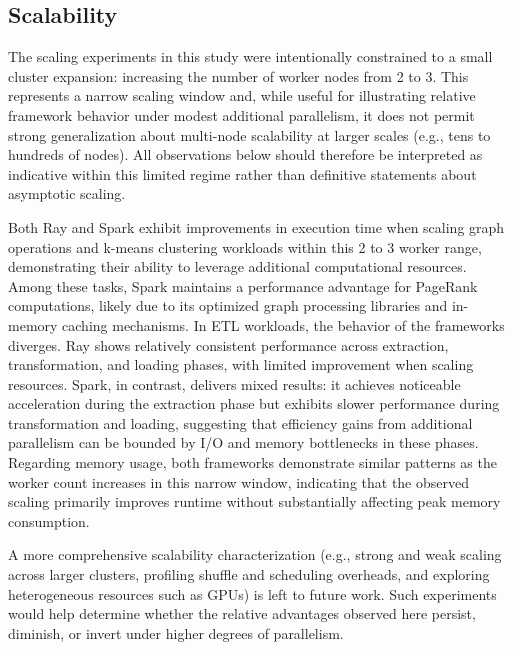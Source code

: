 \documentclass[conference]{IEEEtran}
\begin{document}
\subsection{Scalability}

The scaling experiments in this study were intentionally constrained to a small cluster expansion: 
increasing the number of worker nodes from 2 to 3. 
This represents a narrow scaling window and, while useful for illustrating relative framework behavior under modest additional parallelism, 
it does not permit strong generalization about multi-node scalability at larger scales (e.g., tens to hundreds of nodes). 
All observations below should therefore be interpreted as indicative within this limited regime rather than definitive statements about asymptotic scaling.

Both Ray and Spark exhibit improvements in execution time
when scaling graph operations and k-means clustering workloads
within this 2 to 3 worker range, demonstrating their ability to leverage
additional computational resources. Among these tasks, Spark maintains a
performance advantage for PageRank computations, likely due to
its optimized graph processing libraries and in-memory caching
mechanisms. In ETL workloads, the behavior of the frameworks
diverges. Ray shows relatively consistent performance across
extraction, transformation, and loading phases, with limited
improvement when scaling resources. Spark, in contrast, delivers
mixed results: it achieves noticeable acceleration during the
extraction phase but exhibits slower performance during
transformation and loading, suggesting that efficiency gains
from additional parallelism can be bounded by I/O and memory bottlenecks
in these phases. Regarding memory usage, both frameworks demonstrate
similar patterns as the worker count increases in this narrow window, indicating
that the observed scaling primarily improves runtime without
substantially affecting peak memory consumption.

A more comprehensive scalability characterization 
(e.g., strong and weak scaling across larger clusters, profiling shuffle and scheduling overheads, and exploring heterogeneous resources such as GPUs) 
is left to future work. Such experiments would help determine whether the relative advantages observed here persist, diminish, or invert under higher degrees of parallelism.
\end{document}
